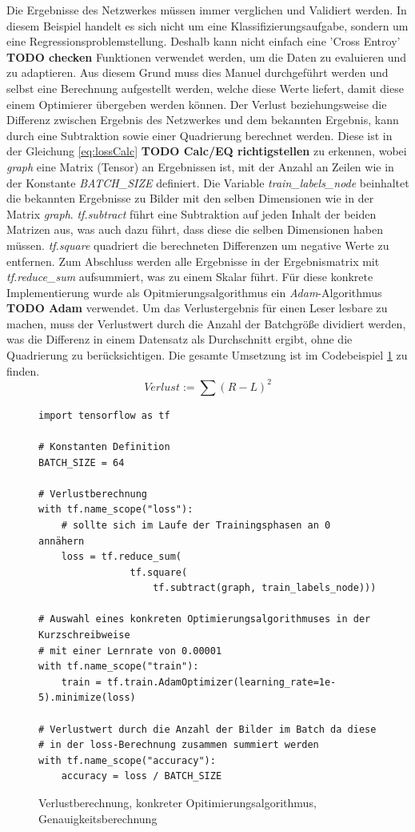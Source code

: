 Die Ergebnisse des Netzwerkes müssen immer verglichen und Validiert werden. 
In diesem Beispiel handelt es sich nicht um eine Klassifizierungsaufgabe, sondern um eine Regressionsproblemstellung. 
Deshalb kann nicht einfach eine 'Cross Entroy' \textbf{TODO checken} Funktionen verwendet werden, um die Daten zu evaluieren und zu adaptieren. 
Aus diesem Grund muss dies Manuel durchgeführt werden und selbst eine Berechnung aufgestellt werden, welche diese Werte liefert, damit diese einem Optimierer übergeben werden können. 
Der Verlust beziehungsweise die Differenz zwischen Ergebnis des Netzwerkes und dem bekannten Ergebnis, kann durch eine Subtraktion sowie einer Quadrierung berechnet werden. 
Diese ist in der Gleichung \ref{eq:lossCalc} \textbf{TODO Calc/EQ richtigstellen} zu erkennen, wobei \textit{graph} eine Matrix (Tensor) an Ergebnissen ist, mit der Anzahl an Zeilen wie in der Konstante \textit{BATCH\_SIZE} definiert. 
Die Variable \textit{train\_labels\_node} beinhaltet die bekannten Ergebnisse zu Bilder mit den selben Dimensionen wie in der Matrix \textit{graph}. 
\textit{tf.subtract} führt eine Subtraktion auf jeden Inhalt der beiden Matrizen aus, was auch dazu führt, dass diese die selben Dimensionen haben müssen. 
\textit{tf.square} quadriert die berechneten Differenzen um negative Werte zu entfernen. 
Zum Abschluss werden alle Ergebnisse in der Ergebnismatrix mit \textit{tf.reduce\_sum} aufsummiert, was zu einem Skalar führt. 
Für diese konkrete Implementierung wurde als Opitmierungsalgorithmus ein \textit{Adam}-Algorithmus \textbf{TODO Adam} verwendet. 
Um das Verlustergebnis für einen Leser lesbare zu machen, muss der Verlustwert durch die Anzahl der Batchgröße dividiert werden, was die Differenz in einem Datensatz als Durchschnitt ergibt, ohne die Quadrierung zu berücksichtigen. 
Die gesamte Umsetzung ist im Codebeispiel \ref{fig:VerlustKonkreOpitimier} zu finden. 
\begin{equation}
	Verlust := \sum{(R - L)^2}
	\label{eq:lossCalc}
\end{equation}
\begin{figure}[ht!]
\lstset{language=Python}
\begin{lstlisting}
import tensorflow as tf

# Konstanten Definition
BATCH_SIZE = 64

# Verlustberechnung
with tf.name_scope("loss"):
    # sollte sich im Laufe der Trainingsphasen an 0 annähern
    loss = tf.reduce_sum(
    			tf.square(
    				tf.subtract(graph, train_labels_node)))

# Auswahl eines konkreten Optimierungsalgorithmuses in der Kurzschreibweise
# mit einer Lernrate von 0.00001
with tf.name_scope("train"):
    train = tf.train.AdamOptimizer(learning_rate=1e-5).minimize(loss)
    
# Verlustwert durch die Anzahl der Bilder im Batch da diese 
# in der loss-Berechnung zusammen summiert werden
with tf.name_scope("accuracy"):    
    accuracy = loss / BATCH_SIZE
\end{lstlisting}
	\caption{Verlustberechnung, konkreter Opitimierungsalgorithmus, Genauigkeitsberechnung}
	\label{fig:VerlustKonkreOpitimier}
\end{figure}
 
